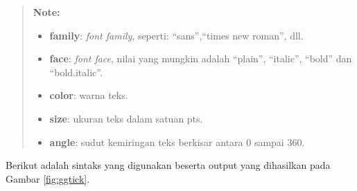\documentclass[]{book}
\newenvironment{Shaded}{\begin{snugshade}}{\end{snugshade}}
\newcommand{\KeywordTok}[1]{\textcolor[rgb]{0.13,0.29,0.53}{\textbf{#1}}}
\newcommand{\DataTypeTok}[1]{\textcolor[rgb]{0.13,0.29,0.53}{#1}}
\newcommand{\DecValTok}[1]{\textcolor[rgb]{0.00,0.00,0.81}{#1}}
\newcommand{\StringTok}[1]{\textcolor[rgb]{0.31,0.60,0.02}{#1}}
\newcommand{\CommentTok}[1]{\textcolor[rgb]{0.56,0.35,0.01}{\textit{#1}}}
\newcommand{\OperatorTok}[1]{\textcolor[rgb]{0.81,0.36,0.00}{\textbf{#1}}}
\newcommand{\NormalTok}[1]{#1}
\providecommand{\tightlist}{%
  \setlength{\itemsep}{0pt}\setlength{\parskip}{0pt}}
\begin{document}
\begin{quote}
\textbf{Note: }

\begin{itemize}
\tightlist
\item
  \textbf{family}: \emph{font family}, seperti: ``sans'',``times new
  roman'', dll.
\item
  \textbf{face}: \emph{font face}, nilai yang mungkin adalah ``plain'',
  ``italic'', ``bold'' dan ``bold.italic''.
\item
  \textbf{color}: warna teks.
\item
  \textbf{size}: ukuran teks dalam satuan pts.
\item
  \textbf{angle}: sudut kemiringan teks berkisar antara 0 sampai 360.
\end{itemize}
\end{quote}

Berikut adalah sintaks yang digunakan beserta output yang dihasilkan
pada Gambar \ref{fig:ggtick}.

\begin{Shaded}
\end{Shaded}
\end{document}
